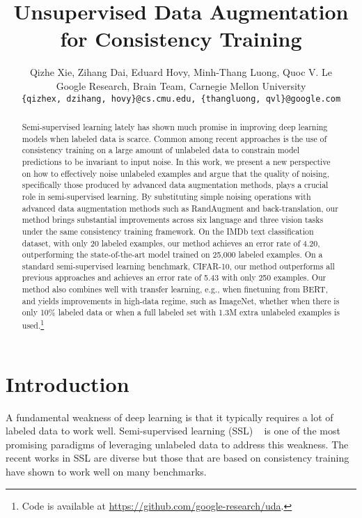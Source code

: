 \documentclass{article}
\title{Unsupervised Data Augmentation\\ for Consistency Training}
\author{Qizhe Xie, Zihang Dai, Eduard Hovy, Minh-Thang Luong, Quoc V. Le\\
 Google Research, Brain Team,  Carnegie Mellon University \\
  \texttt{\{qizhex, dzihang, hovy\}@cs.cmu.edu, \{thangluong, qvl\}@google.com} \\
}
\begin{document}
\maketitle


\begin{abstract}
Semi-supervised learning lately has shown much promise in improving deep learning models when labeled data is scarce. Common among recent approaches is the use of consistency training on a large amount of unlabeled data to constrain model predictions to be invariant to input noise. In this work, we present a new perspective on how to effectively noise unlabeled examples and argue that the quality of noising, specifically those produced by advanced data augmentation methods, plays a crucial role in semi-supervised learning. By substituting simple noising operations with advanced data augmentation methods such as RandAugment and back-translation, our method brings substantial improvements across six language and three vision tasks under the same consistency training framework. On the IMDb text classification dataset, with only 20 labeled examples, our method achieves an error rate of 4.20, outperforming the state-of-the-art model trained on 25,000 labeled examples. On a standard semi-supervised learning benchmark, CIFAR-10, our method outperforms all previous approaches and achieves an error rate of 5.43 with only 250 examples. Our method also combines well with transfer learning, e.g., when finetuning from BERT, and yields improvements in high-data regime, such as ImageNet, whether when there is only 10\% labeled data or when a full labeled set with 1.3M extra unlabeled examples is used.\footnote{Code is available at \url{https://github.com/google-research/uda}.}
\end{abstract}



 \vspace{-0.5em}
\section{Introduction}
\vspace{-0.5em}
\label{sec:intro}


A fundamental weakness of deep learning is that it typically requires a lot of labeled data to work well. 
Semi-supervised learning (SSL) ~\cite{chapelle2009semi} is one of the most promising paradigms of leveraging unlabeled data to address this weakness. The recent works in SSL are diverse but those that are based on consistency training~\cite{bachman2014learning,rasmus2015semi,laine2016temporal,tarvainen2017mean} have  shown to work well on many benchmarks. 
\end{document}
